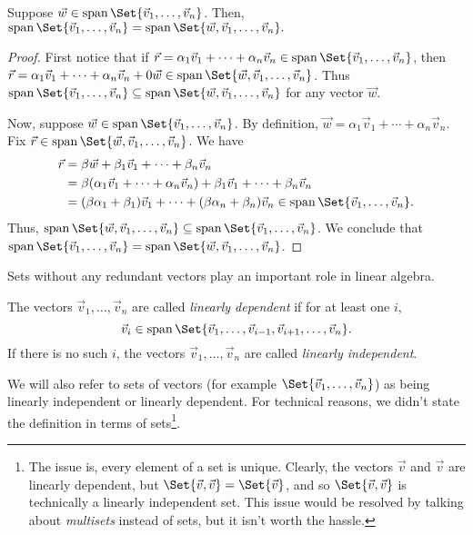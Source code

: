 \begin{theorem}
	Suppose $\vec w\in\Span\Set{\vec v_1,\ldots,\vec v_n}$. Then, 
	$
		\Span\Set{\vec v_1,\ldots,\vec v_n}=\Span\Set{\vec w,\vec v_1,\ldots,\vec v_n}.
	$
\end{theorem}
\begin{proof}
	First notice that if $\vec r=\alpha_1\vec v_1+\cdots+\alpha_n\vec v_n\in\Span\Set{\vec v_1,\ldots,\vec v_n}$,
	then $\vec r=\alpha_1\vec v_1+\cdots+\alpha_n\vec v_n+0\vec w\in \Span\Set{\vec w,\vec v_1,\ldots,\vec v_n}$.
	Thus $\Span\Set{\vec v_1,\ldots,\vec v_n}\subseteq \Span\Set{\vec w,\vec v_1,\ldots,\vec v_n}$ 
	for any vector $\vec w$.

	Now, suppose $\vec w\in \Span\Set{\vec v_1,\ldots,\vec v_n}$. By definition, $\vec w=\alpha_1\vec v_1+\cdots+\alpha_n\vec v_n$.
	Fix $\vec r\in\Span\Set{\vec w,\vec v_1,\ldots,\vec v_n}$.  We have
	\begin{align*}
		\vec r &=
		\beta\vec w+\beta_1\vec v_1+\cdots+\beta_n\vec v_n \\ &=
		\beta(\alpha_1\vec v_1+\cdots+\alpha_n\vec v_n) + \beta_1\vec v_1+\cdots+\beta_n\vec v_n\\
		&= (\beta\alpha_1+\beta_1)\vec v_1+\cdots+(\beta\alpha_n+\beta_n)\vec v_n\in\Span\Set{\vec v_1,\ldots,\vec v_n}.
	\end{align*}
	Thus, $\Span\Set{\vec w,\vec v_1,\ldots,\vec v_n}\subseteq \Span\Set{\vec v_1,\ldots,\vec v_n}$. We
	conclude that $\Span\Set{\vec v_1,\ldots,\vec v_n}=\Span\Set{\vec w,\vec v_1,\ldots,\vec v_n}$.
\end{proof}

Sets without any redundant vectors play an important role in linear algebra.

\begin{definition}
	\label{DEFLININD}
	The vectors $\vec v_1,\ldots,\vec v_n$ are called \emph{linearly dependent} if 
	for at least one $i$, 
	\[
		\vec v_i \in \Span\Set{\vec v_1,\ldots,\vec v_{i-1},\vec v_{i+1},\ldots,\vec v_n}.
	\]
	If there is no such $i$, the vectors $\vec v_1,\ldots,\vec v_n$ are called \emph{linearly
	independent}.
\end{definition}
We will also refer to sets of vectors (for example $\Set{\vec v_1,\ldots,\vec v_n}$) as being linearly
independent or linearly dependent. For technical reasons, we didn't state the definition in terms
of sets\footnote{ The issue is, every element of a set is unique. Clearly, the vectors $\vec v$ and $\vec v$
are linearly dependent, but $\Set{\vec v,\vec v}=\Set{\vec v}$, and so $\Set{\vec v,\vec v}$ is technically
a linearly independent set. This issue would be resolved by talking about \emph{multisets} instead of sets,
but it isn't worth the hassle.}.

